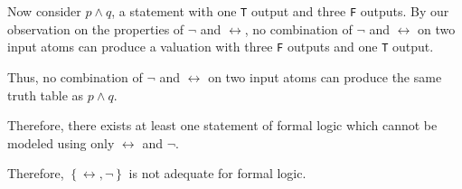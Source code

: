 \documentclass{article}
\begin{document}
Now consider $p \wedge q$, a statement with one \verb|T| output and three
\verb|F| outputs. By our observation on the properties of $\lnot$ and
$\leftrightarrow$, no combination of $\lnot$ and $\leftrightarrow$ on two
input atoms can produce a valuation with three \verb|F| outputs and one
\verb|T| output.

Thus, no combination of $\lnot$ and $\leftrightarrow$ on two input atoms
can produce the same truth table as $p \wedge q$.

Therefore, there exists at least one statement of formal logic which cannot
be modeled using only $\leftrightarrow$ and $\lnot$.

Therefore, $\left\{ \leftrightarrow, \lnot \right\}$ is not adequate for
formal logic.
\end{document}
